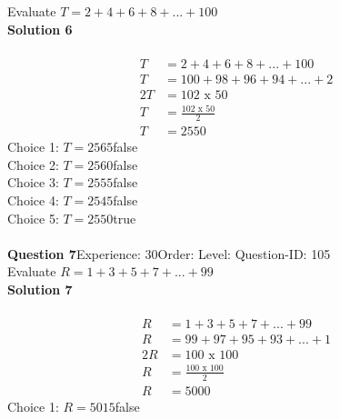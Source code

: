 \documentclass{article}
\begin{document}
Evaluate $T=2+4+6+8+...+100$\\[4pt]
\noindent\textbf{Solution 6}\\[2pt]
\\[-35pt]\begin{align*}
T&=2+4+6+8+...+100\\[2pt]
T&=100+98+96+94+...+2\\[2pt]
2T&=102\,\,\text{x}\,\,50\\[2pt]
T&=\displaystyle\frac{102\,\,\text{x}\,\,50}{2}\\[2pt]
T&=2550
\end{align*}
Choice 1: \hspace{20pt}$T=2565$\hspace{20pt}false\\
Choice 2: \hspace{20pt}$T=2560$\hspace{20pt}false\\
Choice 3: \hspace{20pt}$T=2555$\hspace{20pt}false\\
Choice 4: \hspace{20pt}$T=2545$\hspace{20pt}false\\
Choice 5: \hspace{20pt}$T=2550$\hspace{20pt}true\\
\\[4pt]
\noindent\textbf{Question 7}\hspace{20pt}Experience: 30\hspace{20pt}Order: \hspace{20pt}Level: \hspace{20pt}Question-ID: 105\\[2pt]
Evaluate $R=1+3+5+7+...+99$\\[4pt]
\noindent\textbf{Solution 7}\\[2pt]
\\[-35pt]\begin{align*}
R&=1+3+5+7+...+99\\[2pt]
R&=99+97+95+93+...+1\\[2pt]
2R&=100\,\,\text{x}\,\,100\\[2pt]
R&=\displaystyle\frac{100\,\,\text{x}\,\,100}{2}\\[2pt]
R&=5000
\end{align*}
Choice 1: \hspace{20pt}$R=5015$\hspace{20pt}false\\
\end{document}
